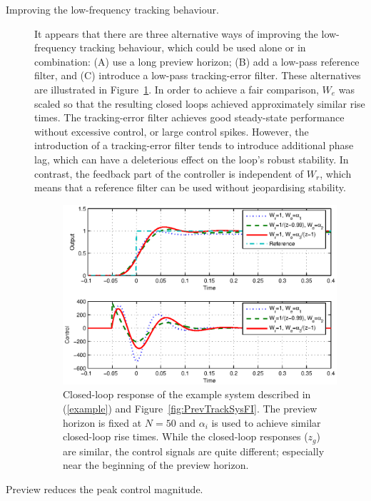 \begin{description}
\item[Improving the low-frequency tracking behaviour.]
It appears that there are three alternative ways of improving the low-frequency tracking behaviour, which could be used alone or in combination: (A) use a long preview horizon; (B) add a low-pass reference filter, and (C) introduce a low-pass tracking-error filter. These alternatives are illustrated in Figure~\ref{fig:CompWzWrNormForSimilarResp}. In order to achieve a fair comparison, $W_e$ was scaled so that the resulting closed loops achieved approximately similar rise times. The tracking-error filter achieves good steady-state performance without excessive control, or large control spikes.
However, the introduction of a tracking-error filter tends to introduce additional phase lag, which can have a deleterious effect on the loop's robust stability. In contrast, the feedback part of the controller is independent of $W_r$, which means that a reference filter can be used without jeopardising stability.  
\begin{figure}
\begin{center}
\includegraphics[width=\columnwidth]{./diags/CompWzWrNormForSimilarResp.eps}
\end{center}	
\caption{Closed-loop response of the example system described in (\ref{example}) and Figure~\ref{fig:PrevTrackSysFI}. The preview horizon is fixed at $N=50$ and $\alpha_i$ is used to achieve similar closed-loop rise times. While the closed-loop responses ($z_g$) are similar, the control signals are quite different; especially near the beginning of the preview horizon. \label{fig:CompWzWrNormForSimilarResp}}
\end{figure}
\item[Preview reduces the peak control magnitude.] 

\end{description}
